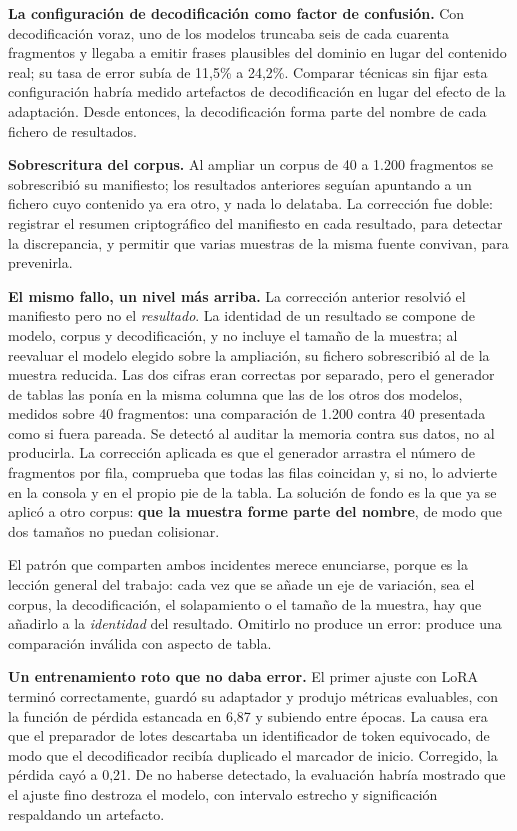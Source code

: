 \textbf{La configuración de decodificación como factor de confusión.} Con decodificación
voraz, uno de los modelos truncaba seis de cada cuarenta fragmentos y llegaba a emitir
frases plausibles del dominio en lugar del contenido real; su tasa de error subía de 11,5\%
a 24,2\%. Comparar técnicas sin fijar esta configuración habría medido artefactos de
decodificación en lugar del efecto de la adaptación. Desde entonces, la decodificación
forma parte del nombre de cada fichero de resultados.

\textbf{Sobrescritura del corpus.} Al ampliar un corpus de 40 a 1.200 fragmentos se
sobrescribió su manifiesto; los resultados anteriores seguían apuntando a un fichero cuyo
contenido ya era otro, y nada lo delataba. La corrección fue doble: registrar el resumen
criptográfico del manifiesto en cada resultado, para detectar la discrepancia, y permitir
que varias muestras de la misma fuente convivan, para prevenirla.

\textbf{El mismo fallo, un nivel más arriba.} La corrección anterior resolvió el manifiesto
pero no el \emph{resultado}. La identidad de un resultado se compone de modelo, corpus y
decodificación, y no incluye el tamaño de la muestra; al reevaluar el modelo elegido sobre
la ampliación, su fichero sobrescribió al de la muestra reducida. Las dos cifras eran
correctas por separado, pero el generador de tablas las ponía en la misma columna que las de
los otros dos modelos, medidos sobre 40 fragmentos: una comparación de 1.200 contra 40
presentada como si fuera pareada. Se detectó al auditar la memoria contra sus datos, no al
producirla. La corrección aplicada es que el generador arrastra el número de fragmentos por
fila, comprueba que todas las filas coincidan y, si no, lo advierte en la consola y en el
propio pie de la tabla. La solución de fondo es la que ya se aplicó a otro corpus:
\textbf{que la muestra forme parte del nombre}, de modo que dos tamaños no puedan colisionar.

El patrón que comparten ambos incidentes merece enunciarse, porque es la lección general del
trabajo: cada vez que se añade un eje de variación, sea el corpus, la decodificación, el
solapamiento o el tamaño de la muestra, hay que añadirlo a la \emph{identidad} del resultado.
Omitirlo no produce un error: produce una comparación inválida con aspecto de tabla.

\textbf{Un entrenamiento roto que no daba error.} El primer ajuste con LoRA terminó
correctamente, guardó su adaptador y produjo métricas evaluables, con la función de pérdida
estancada en 6,87 y subiendo entre épocas. La causa era que el preparador de lotes
descartaba un identificador de token equivocado, de modo que el decodificador recibía
duplicado el marcador de inicio. Corregido, la pérdida cayó a 0,21. De no haberse
detectado, la evaluación habría mostrado que el ajuste fino destroza el modelo, con
intervalo estrecho y significación respaldando un artefacto.


